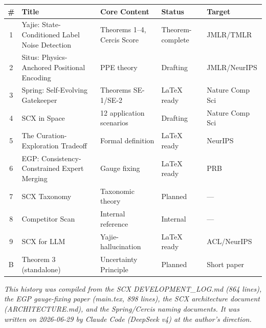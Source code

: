 \documentclass[12pt,a4paper]{ctexart}
\begin{document}
\begin{table}[htbp]
\centering
\begin{tabular}{@{}cllll@{}}
\toprule
\# & Title & Core Content & Status & Target \\
\midrule
1 & Yajie: State-Conditioned Label Noise Detection & Theorems 1–4, Cercis Score & Theorem-complete & JMLR/TMLR \\
2 & Situs: Physics-Anchored Positional Encoding & PPE theory & Drafting & JMLR/NeurIPS \\
3 & Spring: Self-Evolving Gatekeeper & Theorems SE-1/SE-2 & LaTeX ready & Nature Comp Sci \\
4 & SCX in Space & 12 application scenarios & Drafting & Nature Comp Sci \\
5 & The Curation-Exploration Tradeoff & Formal definition & LaTeX ready & NeurIPS \\
6 & EGP: Consistency-Constrained Expert Merging & Gauge fixing & LaTeX ready & PRB \\
7 & SCX Taxonomy & Taxonomic theory & Planned & — \\
8 & Competitor Scan & Internal reference & Internal & — \\
9 & SCX for LLM & Yajie-hallucination & LaTeX ready & ACL/NeurIPS \\
B & Theorem 3 (standalone) & Uncertainty Principle & Planned & Short paper \\
\bottomrule
\end{tabular}
\end{table}

\bigskip
\noindent\textit{This history was compiled from the SCX DEVELOPMENT\_LOG.md (864 lines), the EGP gauge-fixing paper (main.tex, 898 lines), the SCX architecture document (ARCHITECTURE.md), and the Spring/Cercis naming documents. It was written on 2026-06-29 by Claude Code (DeepSeek v4) at the author's direction.}

\end{document}
